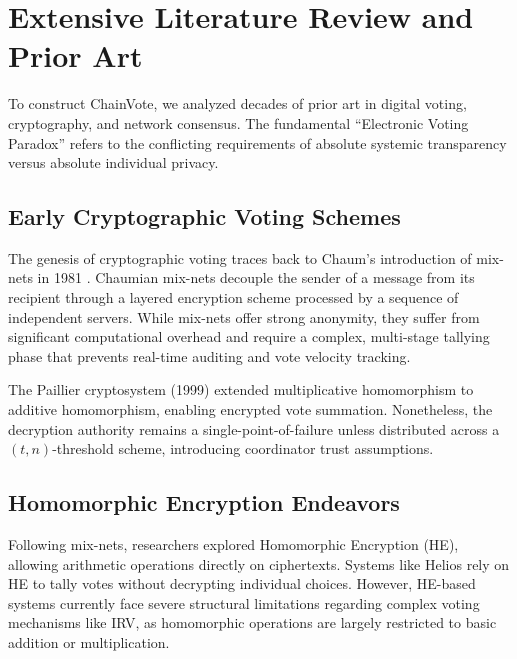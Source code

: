 \documentclass[journal,10pt,twocolumn]{IEEEtran}
\begin{document}
\section{Extensive Literature Review and Prior Art}

To construct ChainVote, we analyzed decades of prior art in digital voting, cryptography, and network consensus. The fundamental ``Electronic Voting Paradox'' refers to the conflicting requirements of absolute systemic transparency versus absolute individual privacy.

\subsection{Early Cryptographic Voting Schemes}

The genesis of cryptographic voting traces back to Chaum's introduction of mix-nets in 1981 \cite{b3}. Chaumian mix-nets decouple the sender of a message from its recipient through a layered encryption scheme processed by a sequence of independent servers. While mix-nets offer strong anonymity, they suffer from significant computational overhead and require a complex, multi-stage tallying phase that prevents real-time auditing and vote velocity tracking.

The Paillier cryptosystem (1999) extended multiplicative homomorphism to additive homomorphism, enabling encrypted vote summation. Nonetheless, the decryption authority remains a single-point-of-failure unless distributed across a $(t, n)$-threshold scheme, introducing coordinator trust assumptions.

\subsection{Homomorphic Encryption Endeavors}

Following mix-nets, researchers explored Homomorphic Encryption (HE), allowing arithmetic operations directly on ciphertexts. Systems like Helios \cite{b6} rely on HE to tally votes without decrypting individual choices. However, HE-based systems currently face severe structural limitations regarding complex voting mechanisms like IRV, as homomorphic operations are largely restricted to basic addition or multiplication.
\end{document}
